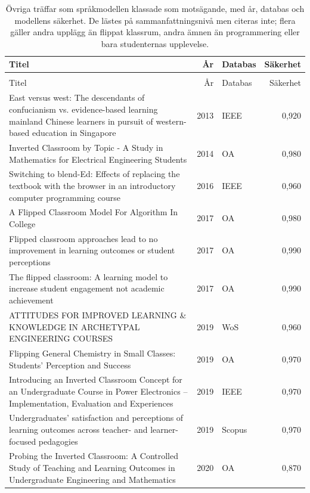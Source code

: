 \begingroup\footnotesize
\begin{longtable}{@{}>{\raggedright\arraybackslash}p{}%
    r>{\raggedright\arraybackslash}p{}r@{}}
  \caption{Övriga träffar som språkmodellen klassade som motsägande, med
    år, databas och modellens säkerhet. De lästes på
    sammanfattningsnivå men citeras inte; flera gäller andra upplägg än
    flippat klassrum, andra ämnen än programmering eller bara studenternas
    upplevelse.}
  \label{tab:flippat-motsager}\\
  \toprule
  Titel & År & Databas & Säkerhet \\
  \midrule
  \endfirsthead
  \multicolumn{4}{@{}l}{\emph{Tabell~\thetable{} (forts.)}}\\
  \toprule
  Titel & År & Databas & Säkerhet \\
  \midrule
  \endhead
  \bottomrule
  \endlastfoot
  East versus west: The descendants of confucianism vs. evidence-based learning mainland Chinese learners in pursuit of western-based education in Singapore & 2013 & IEEE & 0,920 \\
  Inverted Classroom by Topic - A Study in Mathematics for Electrical Engineering Students & 2014 & OA & 0,980 \\
  Switching to blend-Ed: Effects of replacing the textbook with the browser in an introductory computer programming course & 2016 & IEEE & 0,960 \\
  A Flipped Classroom Model For Algorithm In College & 2017 & OA & 0,980 \\
  Flipped classroom approaches lead to no improvement in learning outcomes or student perceptions & 2017 & OA & 0,990 \\
  The flipped classroom: A learning model to increase student engagement not academic achievement & 2017 & OA & 0,990 \\
  ATTITUDES FOR IMPROVED LEARNING \& KNOWLEDGE IN ARCHETYPAL ENGINEERING COURSES & 2019 & WoS & 0,960 \\
  Flipping General Chemistry in Small Classes: Students’ Perception and Success & 2019 & OA & 0,970 \\
  Introducing an Inverted Classroom Concept for an Undergraduate Course in Power Electronics – Implementation, Evaluation and Experiences & 2019 & IEEE & 0,970 \\
  Undergraduates’ satisfaction and perceptions of learning outcomes across teacher- and learner-focused pedagogies & 2019 & Scopus & 0,970 \\
  Probing the Inverted Classroom: A Controlled Study of Teaching and Learning Outcomes in Undergraduate Engineering and Mathematics & 2020 & OA & 0,870 \\

\end{longtable}
